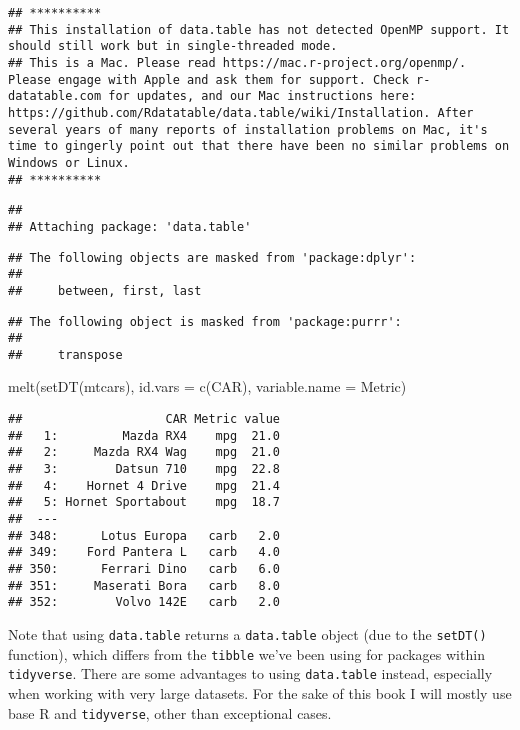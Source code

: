 \documentclass[
]{book}
\newenvironment{Shaded}{\begin{snugshade}}{\end{snugshade}}
\newcommand{\AttributeTok}[1]{\textcolor[rgb]{0.77,0.63,0.00}{#1}}
\newcommand{\FunctionTok}[1]{\textcolor[rgb]{0.00,0.00,0.00}{#1}}
\newcommand{\NormalTok}[1]{#1}
\newcommand{\StringTok}[1]{\textcolor[rgb]{0.31,0.60,0.02}{#1}}
\begin{document}
\begin{verbatim}
## **********
## This installation of data.table has not detected OpenMP support. It should still work but in single-threaded mode.
## This is a Mac. Please read https://mac.r-project.org/openmp/. Please engage with Apple and ask them for support. Check r-datatable.com for updates, and our Mac instructions here: https://github.com/Rdatatable/data.table/wiki/Installation. After several years of many reports of installation problems on Mac, it's time to gingerly point out that there have been no similar problems on Windows or Linux.
## **********
\end{verbatim}

\begin{verbatim}
## 
## Attaching package: 'data.table'
\end{verbatim}

\begin{verbatim}
## The following objects are masked from 'package:dplyr':
## 
##     between, first, last
\end{verbatim}

\begin{verbatim}
## The following object is masked from 'package:purrr':
## 
##     transpose
\end{verbatim}

\begin{Shaded}
\begin{Highlighting}[]
\FunctionTok{melt}\NormalTok{(}\FunctionTok{setDT}\NormalTok{(mtcars), }\AttributeTok{id.vars =} \FunctionTok{c}\NormalTok{(}\StringTok{\textquotesingle{}CAR\textquotesingle{}}\NormalTok{), }\AttributeTok{variable.name =} \StringTok{\textquotesingle{}Metric\textquotesingle{}}\NormalTok{)}
\end{Highlighting}
\end{Shaded}

\begin{verbatim}
##                    CAR Metric value
##   1:         Mazda RX4    mpg  21.0
##   2:     Mazda RX4 Wag    mpg  21.0
##   3:        Datsun 710    mpg  22.8
##   4:    Hornet 4 Drive    mpg  21.4
##   5: Hornet Sportabout    mpg  18.7
##  ---                               
## 348:      Lotus Europa   carb   2.0
## 349:    Ford Pantera L   carb   4.0
## 350:      Ferrari Dino   carb   6.0
## 351:     Maserati Bora   carb   8.0
## 352:        Volvo 142E   carb   2.0
\end{verbatim}

Note that using \texttt{data.table} returns a \texttt{data.table} object (due to the \texttt{setDT()} function), which differs from the \texttt{tibble} we've been using for packages within \texttt{tidyverse}. There are some advantages to using \texttt{data.table} instead, especially when working with very large datasets. For the sake of this book I will mostly use base R and \texttt{tidyverse}, other than exceptional cases.
\end{document}
